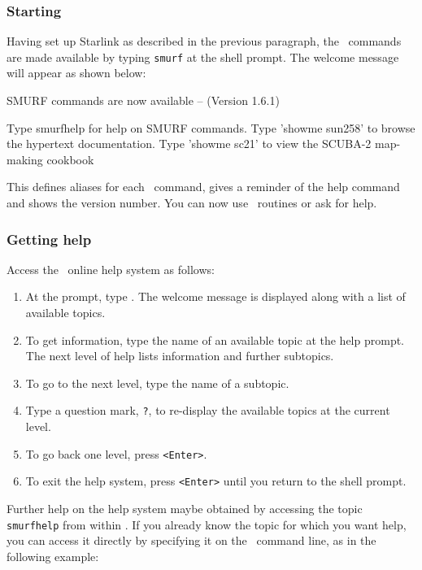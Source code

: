 \documentclass[oneside,11pt]{starlink}
\begin{document}
\subsubsection{Starting \SMURF}

Having set up Starlink as described in the previous paragraph, the
\SMURF\ commands are made available by typing \verb+smurf+ at the shell
prompt. The welcome message will appear as shown below:
\begin{terminalv}


        SMURF commands are now available -- (Version 1.6.1)

        Type smurfhelp for help on SMURF commands.
        Type 'showme sun258' to browse the hypertext documentation.
        Type 'showme sc21' to view the SCUBA-2 map-making cookbook

\end{terminalv}
This defines aliases for each \SMURF\ command, gives a reminder of the
help command and shows the version number. You can now use \SMURF\
routines or ask for help.

\subsubsection{Getting help}

Access the \SMURF\ online help system as follows:
\begin{enumerate}
\item At the prompt, type \smurfhelp. The welcome message is
  displayed along with a list of available topics.
\item To get information, type the name of an available topic at the
  help prompt.  The next level of help lists information and further
  subtopics.
\item To go to the next level, type the name of a subtopic.
\item Type a question mark, \verb+?+, to re-display the available
  topics at the current level.
\item To go back one level, press \verb+<Enter>+.
\item To exit the help system, press \verb+<Enter>+ until you return
  to the shell prompt.
\end{enumerate}
Further help on the help system maybe obtained by accessing the topic
\verb+smurfhelp+ from within \smurfhelp. If you already know the topic
for which you want help, you can access it directly by specifying it on
the \smurfhelp\ command line, as in the following example:
\end{document}
